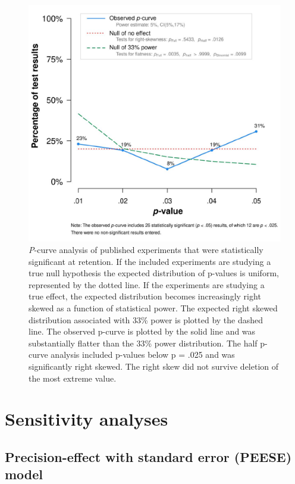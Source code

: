 \documentclass[
  english,
  man,floatsintext]{apa7}
\begin{document}
\begin{figure}

{\centering \includegraphics[width=0.9\linewidth]{../../figs/fig5} 

}

\caption{\emph{P}-curve analysis of published experiments that were statistically significant at retention. If the included experiments are studying a true null hypothesis the expected distribution of p-values is uniform, represented by the dotted line. If the experiments are studying a true effect, the expected distribution becomes increasingly right skewed as a function of statistical power. The expected right skewed distribution associated with 33\% power is plotted by the dashed line. The observed p-curve is plotted by the solid line and was substantially flatter than the 33\% power distribution. The half p-curve analysis included p-values below p = .025 and was significantly right skewed. The right skew did not survive deletion of the most extreme value.}\label{fig:fig5}
\end{figure}

\hypertarget{sensitivity-analyses-1}{%
\section{Sensitivity analyses}\label{sensitivity-analyses-1}}

\hypertarget{precision-effect-with-standard-error-peese-model}{%
\subsection{Precision-effect with standard error (PEESE) model}\label{precision-effect-with-standard-error-peese-model}}
\end{document}
